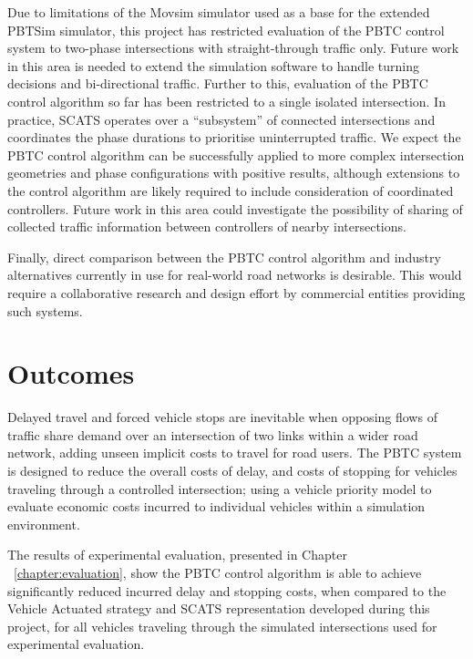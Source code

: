 Due to limitations of the Movsim simulator used as a base for the extended PBTSim simulator, this project has restricted evaluation of the PBTC control system to two-phase intersections with straight-through traffic only. Future work in this area is needed to extend the simulation software to handle turning decisions and bi-directional traffic. Further to this, evaluation of the PBTC control algorithm so far has been restricted to a single isolated intersection. In practice, SCATS operates over a ``subsystem'' of connected intersections and coordinates the phase durations to prioritise uninterrupted traffic. We expect the PBTC control algorithm can be successfully applied to more complex intersection geometries and phase configurations with positive results, although extensions to the control algorithm are likely required to include consideration of coordinated controllers. Future work in this area could investigate the possibility of sharing of collected traffic information between controllers of nearby intersections.

Finally, direct comparison between the PBTC control algorithm and industry alternatives currently in use for real-world road networks is desirable. This would require a collaborative research and design effort by commercial entities providing such systems.

\section{Outcomes}

Delayed travel and forced vehicle stops are inevitable when opposing flows of traffic share demand over an intersection of two links within a wider road network, adding unseen implicit costs to travel for road users. The PBTC system is designed to reduce the overall costs of delay, and costs of stopping for vehicles traveling through a controlled intersection; using a vehicle priority model to evaluate economic costs incurred to individual vehicles within a simulation environment.

The results of experimental evaluation, presented in Chapter ~\ref{chapter:evaluation}, show the PBTC control algorithm is able to achieve significantly reduced incurred delay and stopping costs, when compared to the Vehicle Actuated strategy and SCATS representation developed during this project, for all vehicles traveling through the simulated intersections used for experimental evaluation.

